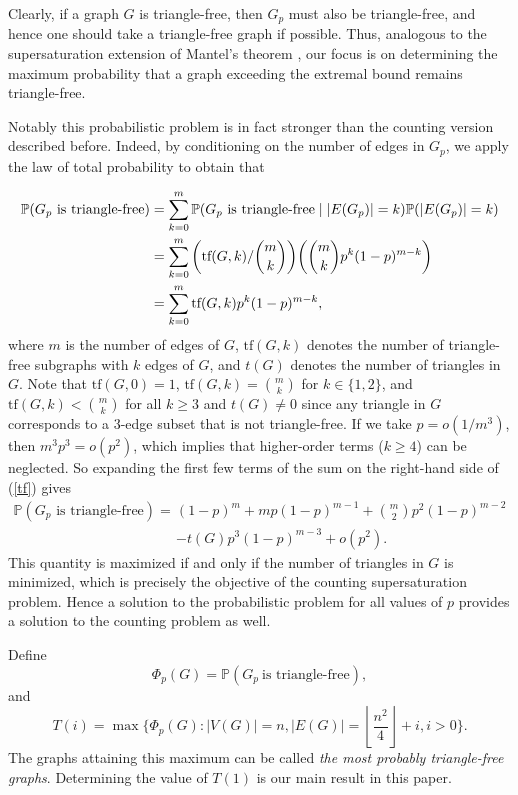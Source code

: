 \documentclass[11pt,a4paper]{article}
\begin{document}
Clearly, if a graph $G$ is triangle-free, then $G_p$ must also be triangle-free, and hence one should
take a triangle-free graph if possible. Thus, analogous to the supersaturation extension of Mantel’s theorem \cite{Man}, our focus is on determining the maximum probability that a graph exceeding the extremal bound remains triangle-free.

Notably this probabilistic problem is in fact stronger than the counting version described before. 
Indeed, by conditioning on the number of edges in $G_p$, we  apply the law of total probability to obtain that

\begin{align}\label{tf}
\mathbb{P}(G_p \text{ is triangle-free}) &= \sum_{k=0}^m \mathbb{P}(G_p \text{ is triangle-free} \mid |E(G_p)|=k) \mathbb{P}(|E(G_p)|=k) \notag\\
&= \sum_{k=0}^m \bigg(\text{tf}(G,k)/\binom{m}{k}\bigg)\bigg(\binom{m}{k}p^k (1-p)^{m-k}\bigg)\notag\\
&= \sum_{k=0}^m \text{tf}(G,k) p^k (1-p)^{m-k},
\end{align}
where $m$ is the number of edges of $G$, $\text{tf}(G,k)$ denotes the number of triangle-free subgraphs  with $k$ edges of $G$, and $t(G)$ denotes the number of triangles in $G$.
Note that $\text{tf}(G,0) =1$, $\text{tf}(G, k) = \binom{m}{k}$ for $k\in \{1,2\}$, and $\text{tf}(G,k) < \binom{m}{k}$ for all $k \ge 3$ and $t(G)\neq 0$ since any triangle in $G$ corresponds to a $3$-edge subset that is not triangle-free.
If we take $p = o(1/m^3)$, then $m^3 p^3 = o(p^2)$, which implies that higher-order terms ($k \ge 4$) can be neglected. So expanding the first few terms of the sum on the right-hand side of (\ref{tf}) gives
\begin{align*}
\mathbb{P}(G_p \text{ is triangle-free}) =& (1-p)^m + m p (1-p)^{m-1} + \binom{m}{2} p^2 (1-p)^{m-2} \\
&- t(G) p^3 (1-p)^{m-3} + o(p^2).
\end{align*}
This quantity is maximized if and only if the number of triangles in $G$ is minimized, which is precisely the objective of the counting supersaturation problem.
Hence a solution to the probabilistic problem for all values of $p$ provides a solution to the counting problem as well.

Define 
$$
\Phi_p(G)=\mathbb P(G_p ~\text{is triangle-free}),
$$
and
$$
T(i)=\max\{\Phi_p(G): |V(G)|=n, |E(G)|=\left\lfloor\frac{n^2}{4}\right\rfloor+i, i>0\}.
$$
The graphs attaining this maximum can be called \emph{the most probably triangle-free graphs}.
Determining the value of $T(1)$ is our main result in this paper.
\end{document}
